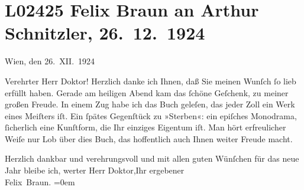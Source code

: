 

\section[Felix Braun an Arthur Schnitzler, 26. 12. 1924]{L02425 Felix Braun an Arthur Schnitzler, 26. 12. 1924}
\nopagebreak{}
\rehead{ }\normalsize\beginnumbering{}
\toendnotes[C]{\smallbreak\pagebreak[2]}
\toendnotes[C]{\smallbreak}
\pstart
           \centering{}{\pb}Wien, den 26. XII. 1924\pend
           
\pstart{}Verehrter Herr Doktor!\pend\vspace{0.5em}
\pstart
           Herzlich danke ich Ihnen, daß Sie meinen Wunſch ſo lieb erfüllt haben. Gerade am
               heiligen Abend kam das ſchöne Geſchenk, zu meiner großen Freude. In einem Zug habe
               ich das Buch geleſen, das
               jeder Zoll ein Werk eines Meiſters iſt. Ein ſpätes Gegenſtück zu »Sterben«: ein epiſches Monodrama, ſicherlich eine Kunſtform, die
               Ihr einziges Eigentum iſt. Man hört erfreulicher Weiſe nur Lob über dies Buch, das hoffentlich auch
               Ihnen weiter Freude macht.\pend
           
\pstart
           Herzlich dankbar und verehrungsvoll {\pb}und mit
               allen guten Wünſchen für das neue Jahr bleibe ich, werter Herr Doktor,\hspace*{1.5em}Ihr ergebener{\\[\baselineskip]}\spacefill\mbox{Felix Braun.}\pend
           \leftskip=0em{}\endnumbering{}  
      